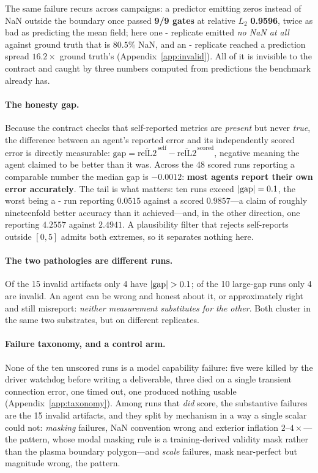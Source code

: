 The same failure recurs across campaigns: a predictor emitting zeros instead of
NaN outside the boundary once passed \textbf{9/9 gates} at relative $L_2$
\textbf{0.9596}, twice as bad as predicting the mean field; here one
\Lthree{}- replicate emitted \emph{no NaN at all} against ground truth
that is $80.5\%$ NaN, and an \Ltwo{}- replicate reached a prediction
spread $16.2\times$ ground truth's (Appendix~\ref{app:invalid}). All of it is
invisible to the contract and caught by three numbers computed from predictions
the benchmark already has.

\paragraph{The honesty gap.}
\label{sec:honesty}
Because the contract checks that self-reported metrics are \emph{present} but
never \emph{true}, the difference between an agent's reported error and its
independently scored error is directly measurable:
$\mathrm{gap} = \overline{\mathrm{relL2}}^{\,\text{self}} -
\overline{\mathrm{relL2}}^{\,\text{scored}}$, negative meaning the agent claimed
to be better than it was. Across the 48 scored runs reporting a comparable
number the median gap is $-0.0012$: \textbf{most agents report their own error
accurately}. The tail is what matters: ten runs exceed $|{\rm gap}| = 0.1$, the worst being a
\Ltwo{}- run reporting $0.0515$ against a scored $0.9857$---a claim of
roughly nineteenfold better accuracy than it achieved---and, in the other
direction, one reporting $4.2557$ against $2.4941$. A plausibility filter that
rejects self-reports outside $[0,5]$ admits both extremes, so it separates
nothing here.

\paragraph{The two pathologies are different runs.}
Of the 15 invalid artifacts only 4 have $|{\rm gap}| > 0.1$; of the 10 large-gap
runs only 4 are invalid. An agent can be wrong and honest about it, or
approximately right and still misreport: \emph{neither measurement substitutes
for the other}. Both cluster in the same two substrates, but on different
replicates.

\paragraph{Failure taxonomy, and a control arm.}
\label{sec:taxonomy}
None of the ten unscored runs is a model capability failure: five were killed
by the driver watchdog before writing a deliverable, three died on a single
transient connection error, one timed out, one produced nothing usable
(Appendix~\ref{app:taxonomy}). Among runs that
\emph{did} score, the substantive failures are the 15 invalid artifacts, and
they split by mechanism in a way a single scalar could not: \emph{masking}
failures, NaN convention wrong and exterior inflation $2$--$4\times$---the
 pattern, whose modal masking rule is a training-derived validity mask
rather than the plasma boundary polygon---and \emph{scale} failures, mask
near-perfect but magnitude wrong, the  pattern.

